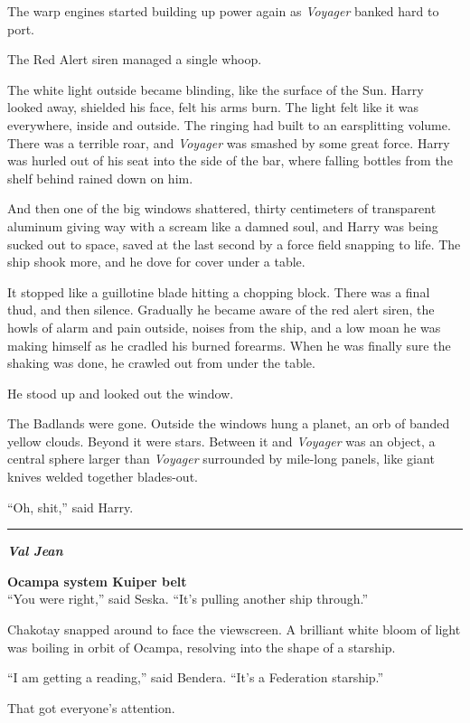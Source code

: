\documentclass[twoside,letterpaper,12pt]{memoir}
\begin{document}
The warp engines started building up power again as \textit{Voyager} banked hard to port.

The Red Alert siren managed a single whoop.

The white light outside became blinding, like the surface of the Sun. Harry looked away, shielded his face, felt his arms burn. The light felt like it was everywhere, inside and outside. The ringing had built to an earsplitting volume. There was a terrible roar, and \textit{Voyager} was smashed by some great force. Harry was hurled out of his seat into the side of the bar, where falling bottles from the shelf behind rained down on him.

And then one of the big windows shattered, thirty centimeters of transparent aluminum giving way with a scream like a damned soul, and Harry was being sucked out to space, saved at the last second by a force field snapping to life. The ship shook more, and he dove for cover under a table.

It stopped like a guillotine blade hitting a chopping block. There was a final thud, and then silence. Gradually he became aware of the red alert siren, the howls of alarm and pain outside, noises from the ship, and a low moan he was making himself as he cradled his burned forearms. When he was finally sure the shaking was done, he crawled out from under the table.

He stood up and looked out the window.

The Badlands were gone. Outside the windows hung a planet, an orb of banded yellow clouds. Beyond it were stars. Between it and \textit{Voyager} was an object, a central sphere larger than \textit{Voyager} surrounded by mile-long panels, like giant knives welded together blades-out.

``Oh, shit,'' said Harry.

\fancybreak{\rule{3cm}{0.4 pt}}
\noindent\textit{\textbf{Val Jean}}

\noindent\textbf{Ocampa system Kuiper belt}\\

``You were right,'' said Seska. ``It’s pulling another ship through.''

Chakotay snapped around to face the viewscreen. A brilliant white bloom of light was boiling in orbit of Ocampa, resolving into the shape of a starship.

``I am getting a reading,'' said Bendera. ``It's a Federation starship.''

That got everyone's attention.
\end{document}
